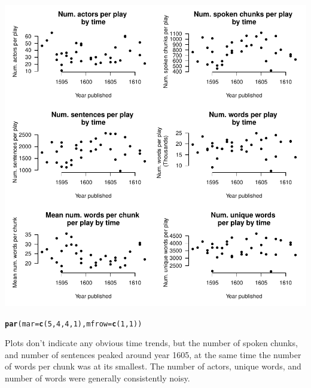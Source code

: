 \documentclass{article}\usepackage[]{graphicx}\usepackage[]{color}
\makeatletter
\def\maxwidth{ %
  \ifdim\Gin@nat@width>\linewidth
    \linewidth
  \else
    \Gin@nat@width
  \fi
}
\newcommand{\hlnum}[1]{\textcolor[rgb]{0.686,0.059,0.569}{#1}}%
\newcommand{\hlstd}[1]{\textcolor[rgb]{0.345,0.345,0.345}{#1}}%
\newcommand{\hlkwc}[1]{\textcolor[rgb]{0.333,0.667,0.333}{#1}}%
\newcommand{\hlkwd}[1]{\textcolor[rgb]{0.737,0.353,0.396}{\textbf{#1}}}%
\newenvironment{kframe}{%
 \def\at@end@of@kframe{}%
 \ifinner\ifhmode%
  \def\at@end@of@kframe{\end{minipage}}%
  \begin{minipage}{\columnwidth}%
 \fi\fi%
 \def\FrameCommand##1{\hskip\@totalleftmargin \hskip-\fboxsep
 \colorbox{shadecolor}{##1}\hskip-\fboxsep
     \hskip-\linewidth \hskip-\@totalleftmargin \hskip\columnwidth}%
 \MakeFramed {\advance\hsize-\width
   \@totalleftmargin\z@ \linewidth\hsize
   \@setminipage}}%
 {\par\unskip\endMakeFramed%
 \at@end@of@kframe}
\newenvironment{knitrout}{}{} %
\makeatother
\begin{document}
\begin{knitrout}
\begin{kframe}
\begin{alltt}
\end{alltt}
\end{kframe}
\includegraphics[width=\maxwidth]{figure/unnamed-chunk-12-1} 
\begin{kframe}\begin{alltt}
\hlkwd{par}\hlstd{(}\hlkwc{mar} \hlstd{=} \hlkwd{c}\hlstd{(}\hlnum{5}\hlstd{,} \hlnum{4}\hlstd{,} \hlnum{4}\hlstd{,} \hlnum{1}\hlstd{),} \hlkwc{mfrow} \hlstd{=} \hlkwd{c}\hlstd{(}\hlnum{1}\hlstd{,}\hlnum{1}\hlstd{))}
\end{alltt}
\end{kframe}
\end{knitrout}

Plots don't indicate any obvious time trends, but the number of spoken chunks, and number of sentences peaked around year 1605, at the same time the number of words per chunk was at its smallest. The number of actors, unique words, and number of words were generally consistently noisy.
\end{document}
